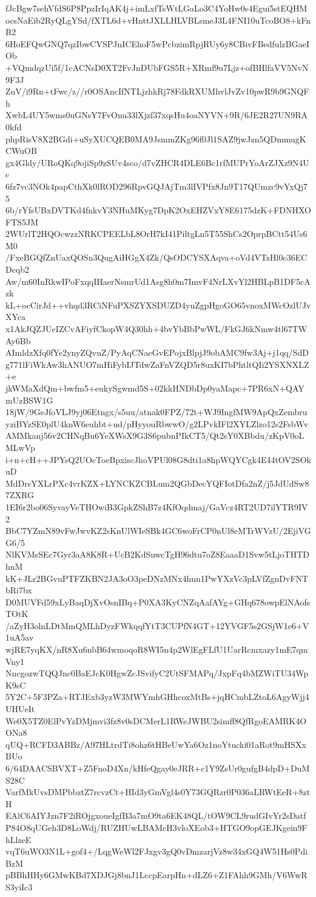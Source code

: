 fJcBgw7sehVfdS6P8PpzIrIqAK4j+imLxfTsWtLGaLo3C4YoHw0s4Egui5stEQHM
ocsNaEib2RyQLgYSd/fXTL6d+vHnttJXLLHLVBLsmeJ3L4FNI10uTcoBO8+kFnR2
6HoEFQwGNQ7qzIbwCVSPJnICEhoF5wPcbzimRpjRUy6y8CBivFBedfulzBGaeIOb
+VQmdqzUi5f/1cACNsD0XT2FvJnDUbFGS5R+XRmf9u7Ljz+ofBHlfaVV5NvN9F3J
ZuV/i9Rn+tFwc/z//r0OSAncIfNTLjzhkRj78FdkRXUMhvlJvZv10pwR9b9GNQFh
XwbL4UY5wms0uGNsY7FvOnu33lXjzf37xqsHu4oaNYVN+9R/6JE2R27UN9RA0kfd
phpRisV8X2BGdi+uSyXUCQEB0MA9JsmmZKg96f0Jl1SAZ9jwJzn5QDmmugKCWuOB
gx4Gldy/URoQKq9ojiSp9zSUv4sco/d7vZHCR4DLE6Bc1rfMUPrYoArZJXz9N4Uc
6fz7vc3NOk4papCthXk0lROD296RpvGQJAjTm3lIVPfx8Jn9T17QUmzc9vYxQj75
6b/rYfsUBxDVTKd4fnkvY3NHuMKyg7DpK2OxEHZVxY8E6175dzK+FDNHXOFTS5JM
2WUrlT2HQOcwzzNRKCPEELbL8OrH7kI41PiltgLn5T55ShCs2OprpBCtt54Us6M0
/FxeBGQfZnUaxQOSn3QugAiHGgX4Zk/QsODCYSXAqva+oVd4VTzHl0c36ECDcqb2
Aw/m60InRkwIPoFxqqIHaerNsmrUd1Asg8h0m7ImvF4NrLXvYl2HBLpB1DF5cAzk
kL+ocCirJd++vhqd3RCiNFuPXSZYXSDUZD4yuZgpHgoGO65vnoxMWcOzlUJvXYca
x1AkJQZJUcIZCvAFiyfCkopW4Q30hh+4bvYbBbPwWL/FkGJ6kNmw4tl67TWAy6Bb
AImldzXfq0fYe2ynyZQvuZ/PyAqCNaeGvEPojxBlpjJ9obAMC9fw3Aj+j1qq/SdD
g771lFiWkAw3hANUO7mHiFybIJTdwZaFnVZQD5r8uxKI7bPhtltQIi2YSXNXLZ+e
jkWMaXdQm+bwfm5+eukySgwmd5S+02kkHNDbDp0yaMapc+7PR6xN+QAYmUzBSW1G
18jW/9GeJfoVLJ9yj06Etngx/s5uu/atnak0FPZ/72t+WJ9IngfMW9ApQxZembru
yziBYzSE0plU4knW6euhbt+ud/pHyyouRbwwO/g2LPvkIFl2XYLZlzo12s2FsbWv
AMMkanj56v2CHNqBu6YeXWsX9G3S6pubnPIkCT5/Qt2sY0XBbdu/zKpV0oLMLwVp
i+n+cH++JPYsQ2UOcToeBpxiscJhoVPUl08G8dti1a8hpWQYCgk4E44tOV2SOkuD
MdDrsYXLrPXc4vrKZX+LYNCKZCBLum2QGbDecYQFIotDfa2nZ/j5JdUdSw87ZXRG
1EI6r2bo06SyvayVeTHOwiB3GpkZShB7z4KfOqdmaj/GaVcz4RT2UD7ilYTR9IV2
BbC7YZmN89vFwJwvKZ2sKnUlWIeSBk4GC6woFrCP0nUl8eMTrWVzU/2EjiVGG6/5
NlKVMsSEc7Gyr3aA8K8R+UcB2KdSuwcTgH96dtu7oZ8EaaaD1Svw5tLjoTHTDhnM
kK+JLr2BGvuPTFZKBN2JA3oO3peDNzMNx4hnn1PwYXzVc3pLVfZgnDvFNTbRi7bx
D0MUVFd59xLyBaqDjXvOsnIBq+P0XA3KyCNZqAafAYg+GHq678owpElNAofsTOtK
/aZyH3olnLDtMmQMLhDyzFWkqqfYtT3CUPfN4GT+12YVGF5s2GSjW1e6+V1uA5av
wjRE7yqKX/nR8Xu6nbB64wmoqoR8WI5n4p2WlEgFLfU1UarRcmxazy1mE7qmVny1
NncgozwTQQJnc0BaEJcK0HgwZcJSvifyC2UtSFMAPq/JxpFq4bMZWiTU34WpK9sC
5Y2C+5F3PZa+RTJExb3yzW3MWYmhGHhcoxMtBs+jqHCmbLZtoL6AgyWjj4UHUeIt
We0X5TZ0ElPvYzDMjmvi3fz8v0sDCMerL1RWeJWBU2simff8QfRgoEAMRK4OONa8
qUQ+RCFD3ABBz/A97HLtrdTi8ohz6tHBeUwYa6Oz1noYtucki01aRot9mHSXxBUo
6/64DAACSBVXT+Z5FnoD4Xn/kHfeQgay0eJRR+c1Y9ZsUr0gufgB4dpD+DuMS28C
VarfMkUvsDMPbbztZ7rcvzCt+HId3yGmVgl4s0Y73GQRzr0P036aLRWtEeR+8ztH
EAlC6AIYJzn7F2iROjgxoueIgfB3a7mO9ta6EK48QL/tOW9CL9rudGIvYr2sDatf
P84O8qUGeh3D8LoWdj/RUZHUwLBAMcH3vloXEob3+HTGO9opGEJKgein9FhLlzeE
vqT6uWO3N1L+gof4+/LqgWeWl2FJxgv3gQ0vDmzarjVz8w34xGQ4W51Hs0PdiBzM
pBBhHHy6GMwKBd7XDJGj8bnJ1LccpEarpHn+dLZ6+Z1FAhh9GMh/V6WwRS3yiIc3
